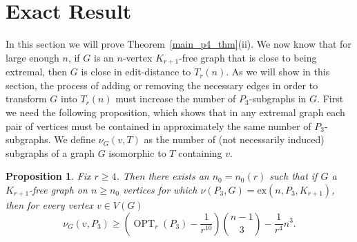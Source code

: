\documentclass[12pt]{article}
\newtheorem{prop}[thm]{Proposition}
\newcommand{\ext}{\text{ex}}
\DeclareMathOperator{\OPT}{OPT}
\begin{document}
\section{Exact Result}\label{sec:exact_result}

In this section we will prove Theorem~\ref{main_p4_thm}(ii). We now know that
for large enough $n$, if $G$ is an $n$-vertex $K_{r+1}$-free graph that is close
to being extremal, then $G$ is close in edit-distance to $T_r(n)$. As we will
show in this section, the process of adding or removing the necessary edges in
order to transform $G$ into $T_r(n)$ must increase the number of
$P_3$-subgraphs in $G$. First we need the following proposition, which
shows that in any extremal graph each pair of vertices must be contained in
approximately the same number of $P_3$-subgraphs. We define $\nu_G(v,T)$ as the number of (not necessarily induced) subgraphs of a graph $G$
isomorphic to $T$ containing $v$.

\begin{prop}\label{prop_lower_bound_path_vertex}
Fix $r \geq 4$. Then there exists an $n_0 = n_0(r)$ such that if $G$ a $K_{r+1}$-free graph on $n \geq n_0$ vertices for which $\nu(P_3,G) = \ext(n,P_3,K_{r+1})$, then for every vertex $v \in V(G)$
\[ 
\nu_G(v,P_3) \geq \left( \OPT_r(P_3) - \frac{1}{r^{10}} \right)\binom{n-1}{3} - \frac{1}{r^4}n^3 . 
\]
\end{prop}
\end{document}
